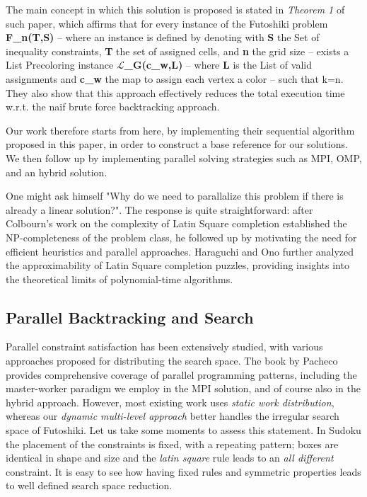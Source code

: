 The main concept in which this solution is proposed is stated in \textit{Theorem 1} of such paper, which affirms that for every instance of the Futoshiki problem \textbf{F\_n(T,S)} -- where an instance is defined by denoting with \textbf{S} the Set of inequality constraints, \textbf{T} the set of assigned cells, and \textbf{n} the grid size -- exists a List Precoloring instance \textbf{$\mathcal{L}$\_G(c\_w,L)} -- where \textbf{L} is the List of valid assignments and \textbf{c\_w} the map to assign each vertex a color -- such that k=n. They also show that this approach effectively reduces the total execution time w.r.t. the naif brute force backtracking approach.

Our work therefore starts from here, by implementing their sequential algorithm proposed in this paper, in order to construct a base reference for our solutions. We then follow up by implementing parallel solving strategies such as MPI, OMP, and an hybrid solution.


One might ask himself "Why do we need to parallalize this problem if there is already a linear solution?". The response is quite straightforward: after Colbourn's work \cite{Colbourn1984} on the complexity of Latin Square completion established the NP-completeness of the problem class, he followed up by motivating the need for efficient heuristics and parallel approaches. Haraguchi and Ono \cite{Haraguchi2014} further analyzed the approximability of Latin Square completion puzzles, providing insights into the theoretical limits of polynomial-time algorithms.

\subsection{Parallel Backtracking and Search}
\label{subsec:backtrack}
Parallel constraint satisfaction has been extensively studied, with various approaches proposed for distributing the search space. The book by Pacheco \cite{Pacheco2011} provides comprehensive coverage of parallel programming patterns, including the master-worker paradigm we employ in the MPI solution, and of course also in the hybrid approach. However, most existing work uses \textit{static work distribution}, whereas our \textit{dynamic multi-level approach} better handles the irregular search space of Futoshiki.
Let us take some moments to assess this statement.
In Sudoku the placement of the constraints is fixed, with a repeating pattern; boxes are identical in shape and size and the \textit{latin square} rule leads to an \textit{all different} constraint. It is easy to see how having fixed rules and symmetric properties leads to well defined search space reduction.


